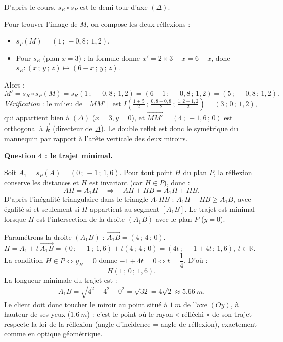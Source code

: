 \documentclass[11pt]{article}
\newcommand{\cle}[1]{{\popxbold\color{popdark}#1}}
\begin{document}
\begin{exoresolu}
D'après le cours, $s_R \circ s_P$ est le \cle{demi-tour} d'axe $(\Delta)$.

Pour trouver l'image de $M$, on compose les deux réflexions :
\begin{itemize}
\item $s_P(M) = (1\,;\,-0{,}8\,;\,1{,}2)$.
\item Pour $s_R$ (plan $x = 3$) : la formule donne $x' = 2 \times 3 - x = 6 - x$, donc $s_R : (x\,;\,y\,;\,z) \mapsto (6 - x\,;\,y\,;\,z)$.
\end{itemize}
Alors :
\[
M' = s_R \circ s_P(M) = s_R(1\,;\,-0{,}8\,;\,1{,}2) = (6 - 1\,;\,-0{,}8\,;\,1{,}2) = (5\,;\,-0{,}8\,;\,1{,}2).
\]
\emph{Vérification} : le milieu de $[MM']$ est $I\left(\frac{1+5}{2}\,;\,\frac{0{,}8-0{,}8}{2}\,;\,\frac{1{,}2+1{,}2}{2}\right) = (3\,;\,0\,;\,1{,}2)$, qui appartient bien à $(\Delta)$ ($x=3, y=0$), et $\overrightarrow{MM'} = (4\,;\,-1{,}6\,;\,0)$ est orthogonal à $\vec{k}$ (directeur de $\Delta$). Le double reflet est donc le symétrique du mannequin par rapport à l'arête verticale des deux miroirs.

\textbf{Question 4 : le trajet minimal.}

Soit $A_1 = s_P(A) = (0\,;\,-1\,;\,1{,}6)$. Pour tout point $H$ du plan $P$, la réflexion conserve les distances et $H$ est invariant (car $H \in P$), donc :
\[
AH = A_1H \quad \Longrightarrow \quad AH + HB = A_1H + HB.
\]
D'après l'inégalité triangulaire dans le triangle $A_1HB$ : $A_1H + HB \geq A_1B$, avec égalité si et seulement si $H$ appartient au segment $[A_1B]$. Le trajet est minimal lorsque $H$ est l'intersection de la droite $(A_1B)$ avec le plan $P$ ($y = 0$).

Paramétrons la droite $(A_1B)$ : $\overrightarrow{A_1B} = (4\,;\,4\,;\,0)$.
$H = A_1 + t\,\overrightarrow{A_1B} = (0\,;\,-1\,;\,1{,}6) + t(4\,;\,4\,;\,0) = (4t\,;\,-1 + 4t\,;\,1{,}6)$, \quad $t \in \mathbb{R}$.
La condition $H \in P \iff y_H = 0$ donne $-1 + 4t = 0 \iff t = \dfrac{1}{4}$.
D'où :
\[
H\left(1\,;\,0\,;\,1{,}6\right).
\]
La longueur minimale du trajet est :
\[
A_1B = \sqrt{4^2 + 4^2 + 0^2} = \sqrt{32} = 4\sqrt{2} \approx \SI{5,66}{m}.
\]
Le client doit donc toucher le miroir au point situé à $\SI{1}{m}$ de l'axe $(Oy)$, à hauteur de ses yeux ($\SI{1,6}{m}$) : c'est le point où le rayon « réfléchi » de son trajet respecte la loi de la réflexion (angle d'incidence = angle de réflexion), exactement comme en optique géométrique.
\end{exoresolu}
\end{document}
